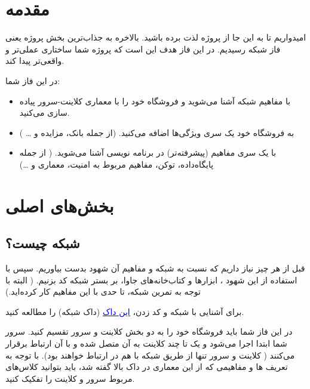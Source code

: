 \documentclass[]{article}
\begin{document}
\newpage

\section*{{\titr مقدمه}}
امیدواریم تا به این جا از پروژه لذت برده باشید. بالاخره به جذاب‌ترین بخش پروژه یعنی فاز شبکه رسیدیم. در این فاز هدف این است که پروژه شما ساختاری عملی‌تر و واقعی‌تر پیدا کند.

در این فاز شما:

\begin{itemize}


\item
 با مفاهیم شبکه آشنا می‌شوید و فروشگاه خود را با معماری کلاینت-سرور پیاده سازی می‌کنید.
 
 \item
 
به فروشگاه خود یک سری ویژگی‌ها اضافه می‌کنید. (از جمله بانک، مزایده و … )

\item
با یک سری مفاهیم (پیشرفته‌تر)‌ در برنامه نویسی آشنا می‌شوید. ( از جمله پایگاه‌داده، توکن، مفاهیم مربوط به امنیت، معماری  و …)


\end{itemize}
\newpage
\section*{{\titr بخش‌های اصلی }}

\subsection*{{\titr شبکه چیست؟}}

قبل از هر چیز نیاز داریم که نسبت به شبکه و مفاهیم آن شهود بدست بیاوریم. سپس با استفاده از این شهود ، ابزار‌ها و کتاب‌خانه‌های جاوا، بر بستر شبکه کد بزنیم. ( البته با توجه به تمرین شبکه، تا حدی با این مفاهیم کار کرده‌اید.)


برای آشنایی با شبکه و کد زدن، \href{https://en.wikipedia.org/wiki/Apache_Maven}{\textcolor{blue}{\underline{{این داک}}}} (\textcolor{CustomColor}{داک شبکه}) را مطالعه کنید.


در این فاز شما باید فروشگاه خود را به دو بخش کلاینت و سرور تقسیم کنید. سرور شما ابتدا اجرا می‌شود و یک تا چند کلاینت به آن متصل شده و با آن ارتباط برقرار می‌کنند ( کلاینت و سرور تنها از طریق شبکه با هم در ارتباط خواهند بود). با توجه به تعریف ها و مفاهیمی که از این معماری در داک بالا گفته شد، باید  بتوانید کلاس‌های مربوط سرور و کلاینت را تفکیک کنید.
\end{document}
